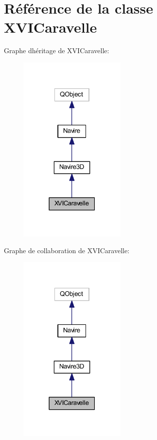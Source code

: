 \hypertarget{class_x_v_i_caravelle}{}\section{Référence de la classe X\+V\+I\+Caravelle}
\label{class_x_v_i_caravelle}


Graphe d\textquotesingle{}héritage de X\+V\+I\+Caravelle\+:
\nopagebreak
\begin{figure}[H]
\begin{center}
\leavevmode
\includegraphics[width=150pt]{class_x_v_i_caravelle__inherit__graph}
\end{center}
\end{figure}


Graphe de collaboration de X\+V\+I\+Caravelle\+:
\nopagebreak
\begin{figure}[H]
\begin{center}
\leavevmode
\includegraphics[width=150pt]{class_x_v_i_caravelle__coll__graph}
\end{center}
\end{figure}
